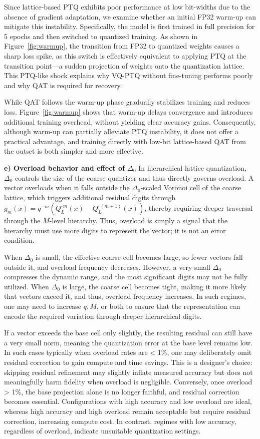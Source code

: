 \documentclass{article}
\theoremstyle{definition}
\theoremstyle{remark}
\begin{document}
Since lattice-based PTQ exhibits poor performance at low bit-widths due to the absence of gradient adaptation, we examine whether an initial FP32 warm-up can mitigate this instability. Specifically, the model is first trained in full precision for 5 epochs and then switched to quantized training. As shown in Figure~\ref{fig:warmup}, the transition from FP32 to quantized weights causes a sharp loss spike, as this switch is effectively equivalent to applying PTQ at the transition point—a sudden projection of weights onto the quantization lattice. This PTQ-like shock explains why VQ-PTQ without fine-tuning performs poorly and why QAT is required for recovery.

While QAT follows the warm-up phase gradually stabilizes training and reduces loss. Figure~\ref{fig:warmup} shows that warm-up delays convergence and introduces additional training overhead, without yielding clear accuracy gains. Consequently, although warm-up can partially alleviate PTQ instability, it does not offer a practical advantage, and training directly with low-bit lattice-based QAT from the outset is both simpler and more effective.

\textbf{e) Overload behavior and effect of $\Delta_0$ }
In hierarchical lattice quantization, $\Delta_{0}$ controls the size of the coarse quantizer and thus directly governs overload. A vector overloads when it falls outside the $\Delta_{0}$-scaled Voronoi cell of the coarse lattice, which triggers additional residual digits through $g_m(x)=q^{-m}\!\left(Q_L^{\circ m}(x)-Q_L^{\circ (m+1)}(x)\right)$, thereby requiring deeper traversal through the $M$-level hierarchy. Thus, overload is simply a signal that the hierarchy must use more digits to represent the vector; it is not an error condition.

When $\Delta_0$ is small, the effective coarse cell becomes large, so fewer vectors fall outside it, and overload frequency decreases. However, a very small $\Delta_0$ compresses the dynamic range, and the most significant digits may not be fully utilized. When $\Delta_0$ is large, the coarse cell becomes tight, making it more likely that vectors exceed it, and thus, overload frequency increases. In such regimes, one may need to increase $q,M$, or both to ensure that the representation can encode the required variation through deeper hierarchical digits.

If a vector exceeds the base cell only slightly, the resulting residual can still have a very small norm, meaning the quantization error at the base level remains low. In such cases typically when overload rates are < 1\%, one may deliberately omit residual correction to gain compute and time savings. This is a designer’s choice: skipping residual refinement may slightly inflate measured accuracy but does not meaningfully harm fidelity when overload is negligible. Conversely, once overload > 1\%, the base projection alone is no longer faithful, and residual correction becomes essential. Configurations with high accuracy and low overload are ideal, whereas high accuracy and high overload remain acceptable but require residual correction, increasing compute cost.
In contrast, regimes with low accuracy, regardless of overload, indicate unsuitable quantization settings.
\end{document}
